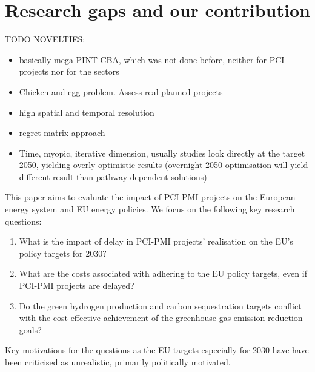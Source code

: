 \documentclass[preprint,12pt,sort&compress]{elsarticle}
\begin{document}
\section{Research gaps and our contribution}

TODO NOVELTIES:
\begin{itemize}
  \item basically mega PINT CBA, which was not done before, neither for PCI projects nor for the sectors
  \item Chicken and egg problem. Assess real planned projects
  \item high spatial and temporal resolution
  \item regret matrix approach
  \item Time, myopic, iterative dimension, usually studies look directly at the target 2050, yielding overly optimistic results (overnight 2050 optimisation will yield different result than pathway-dependent solutions)
\end{itemize}

This paper aims to evaluate the impact of PCI-PMI projects on the European energy system and EU energy policies. We focus on the following key research questions:

\begin{enumerate} 
  \item What is the impact of delay in PCI-PMI projects' realisation on the EU's policy targets for 2030?
  \item What are the costs associated with adhering to the EU policy targets, even if PCI-PMI projects are delayed? 
  \item Do the green hydrogen production and carbon sequestration targets conflict with the cost-effective achievement of the greenhouse gas emission reduction goals? 
\end{enumerate}

Key motivations for the questions as the EU targets especially for 2030 have have been criticised as unrealistic, primarily politically motivated. \cite{europeancourtofauditorsEUsIndustrialPolicy2024,greevenbroekLittleLoseCase2024}


\newpage
\end{document}
